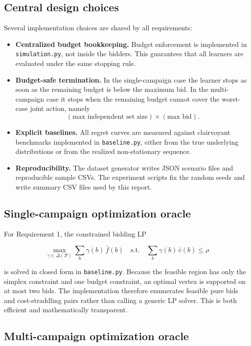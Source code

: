 \documentclass[11pt,a4paper]{article}
\begin{document}
\subsection{Central design choices}

Several implementation choices are shared by all requirements:

\begin{itemize}
  \item \textbf{Centralized budget bookkeeping.} Budget enforcement is implemented
  in \texttt{simulation.py}, not inside the bidders. This guarantees that all
  learners are evaluated under the same stopping rule.
  \item \textbf{Budget-safe termination.} In the single-campaign case the learner
  stops as soon as the remaining budget is below the maximum bid. In the
  multi-campaign case it stops when the remaining budget cannot cover the
  worst-case joint action, namely
  \[
  (\text{max independent set size}) \times (\text{max bid}).
  \]
  \item \textbf{Explicit baselines.} All regret curves are measured against
  clairvoyant benchmarks implemented in \texttt{baseline.py}, either from the
  true underlying distributions or from the realized non-stationary sequence.
  \item \textbf{Reproducibility.} The dataset generator writes JSON scenario files
  and reproducible sample CSVs. The experiment scripts fix the random seeds and
  write summary CSV files used by this report.
\end{itemize}

\subsection{Single-campaign optimization oracle}

For Requirement 1, the constrained bidding LP

\[
\max_{\gamma \in \Delta(\mathcal{B})} \sum_b \gamma(b)\,\bar f(b)
\quad
\text{s.t.}
\quad
\sum_b \gamma(b)\,\bar c(b)\le \rho
\]

is solved in closed form in \texttt{baseline.py}. Because the feasible region has
only the simplex constraint and one budget constraint, an optimal vertex is
supported on at most two bids. The implementation therefore enumerates feasible
pure bids and cost-straddling pairs rather than calling a generic LP solver.
This is both efficient and mathematically transparent.

\subsection{Multi-campaign optimization oracle}
\end{document}
